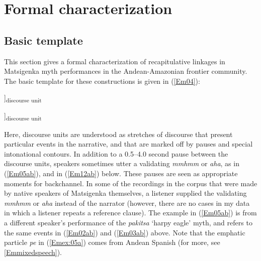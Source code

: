 \documentclass[output=paper]{LSP/langsci}
\begin{document}
\section{ Formal characterization}
\label{Emformal}
\subsection{Basic template}
\label{Embasic}
This section gives a formal characterization of recapitulative linkages in Matsigenka myth performances in the Andean-Amazonian frontier community. The basic template for these constructions is given in (\ref{Em04}): 
 

\begin{exe}
\ex \label{Em04}
\glt [...[\underline{Reference clause}]]\textsubscript{discourse unit}


\glt[[\textbf{Bridging clause}] [Discourse-new information]]\textsubscript{discourse unit}\\
\end{exe}



Here, discourse units are understood as stretches of discourse that present particular events in the narrative, and that are marked off by pauses and special intonational contours. In addition to a 0.5--4.0 second pause between the discourse units, speakers sometimes utter a validating \textit{mmhmm} or \textit{aha}, as in (\ref{Em05ab}), and in (\ref{Em12ab}) below. These pauses are seen as appropriate moments for backchannel. In some of the recordings in the corpus that were made by native speakers of Matsigenka themselves, a listener supplied the validating \textit{mmhmm} or \textit{aha} instead of the narrator (however, there are no cases in my data in which a listener repeats a reference clause). The example in (\ref{Em05ab}) is from a different speaker’s performance of the \textit{pakitsa} `harpy eagle' myth, and refers to the same events in (\ref{Em02ab}) and (\ref{Em03ab}) above. Note that the emphatic particle \textit{pe} in (\ref{Emex:05a}) comes from Andean Spanish (for more, see \ref{Emmixedspeech}).
\end{document}
